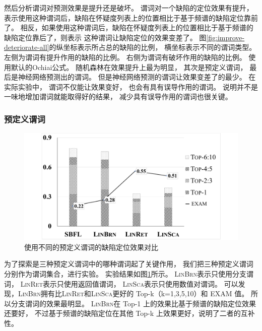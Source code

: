 然后分析谓词对预测效果是提升还是破坏。
谓词对一个缺陷的定位效果有提升，表示使用这种谓词后，缺陷在怀疑度列表上的位置相比于基于频谱的缺陷定位靠前了。
相反，如果使用这种谓词后，缺陷在怀疑度列表上的位置相比于基于频谱的缺陷定位靠后了，则表示
这种谓词让缺陷定位的效果变差了。
图\ref{fig:improve-deteriorate-all}的纵坐标表示所占总的缺陷的比例，
横坐标表示不同的谓词类型。
左侧为谓词有提升作用的缺陷的比例。
右侧为谓词有破坏作用的缺陷的比例。
使用默认的Ochiai公式。
随机森林在效果提升上最为明显，
其次是预定义谓词，
最后是神经网络预测出的谓词。
但是神经网络预测的谓词让效果变差了的最少。
在实际实验中，
谓词不仅能让效果变好，
也会有具有误导作用的谓词。
说明并不是一味地增加谓词就能取得好的结果，
减少具有误导作用的谓词也很关键。


\subsubsection{预定义谓词}

\begin{figure}[htbp] 
\centering 
\includegraphics[width=12cm]{figure/diff-predictor-compare} 
\caption{使用不同的预定义谓词的缺陷定位效果对比} 
\label{fig:diff-predictor-compare}
\end{figure}

为了探索是三种预定义谓词中的哪种谓词起了关键作用，
我们把三种预定义谓词分别作为谓词集合，进行实验。
实验结果如图\ref{fig:diff-predictor-compare}所示。
\textsc{LinBrn}表示只使用分支谓词，
\textsc{LinRet}表示只使用返回值谓词，
\textsc{LinSca}表示只使用数值对谓词。
可以发现，\textsc{LinBrn}拥有比\textsc{LinRet}和\textsc{LinSca}更好的 Top-k（k=1,3,5,10）和 EXAM 值。
所以分支谓词的效果最明显。
\textsc{LinBrn}在 Top-1 上的效果比基于频谱的缺陷定位效果还要好，
不过基于频谱的缺陷定位在其他 Top-k 上效果更好，说明了二者的互补性。

